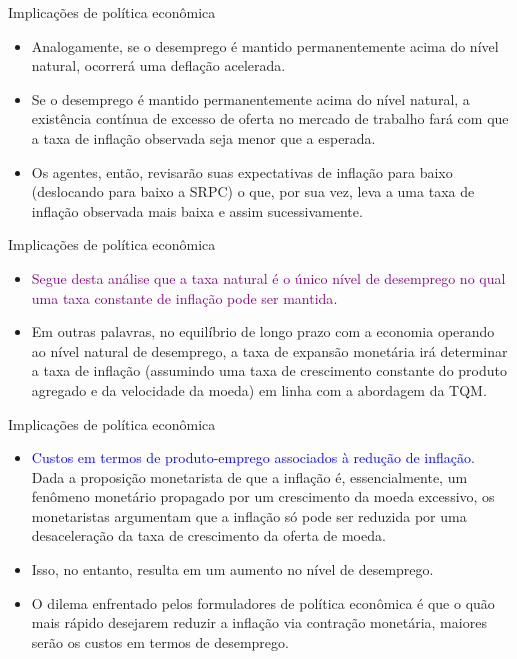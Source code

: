\documentclass[10pt]{beamer}
\begin{document}
\begin{frame}{Implicações de política econômica}
    \begin{itemize}
        \item Analogamente, se o desemprego é mantido permanentemente acima do nível natural, ocorrerá uma deflação acelerada.
        \bigskip
        \item Se o desemprego é mantido permanentemente acima do nível natural, a existência contínua de excesso de oferta no mercado de trabalho fará com que a taxa de inflação observada seja menor que a esperada.
        \bigskip
        \item Os agentes, então, revisarão suas expectativas de inflação para baixo (deslocando para baixo a SRPC) o que, por sua vez, leva a uma taxa de inflação observada mais baixa e assim sucessivamente.
    \end{itemize}    
\end{frame}

\begin{frame}{Implicações de política econômica}
    \begin{itemize}
        \item \textcolor{purple}{Segue desta análise que a taxa natural é o único nível de desemprego no qual uma taxa constante de inflação pode ser mantida}.
        \bigskip
        \item Em outras palavras, no equilíbrio de longo prazo com a economia operando ao nível natural de desemprego, a taxa de expansão monetária irá determinar a taxa de inflação (assumindo uma taxa de crescimento constante do produto agregado e da velocidade da moeda) em linha com a abordagem da TQM.
    \end{itemize}    
\end{frame}

\begin{frame}{Implicações de política econômica}
    \begin{itemize}
        \item \textcolor{blue}{Custos em termos de produto-emprego associados à redução de inflação}. Dada a proposição monetarista de que a inflação é, essencialmente, um fenômeno monetário propagado por um crescimento da moeda excessivo, os monetaristas argumentam que a inflação só pode ser reduzida por uma desaceleração da taxa de crescimento da oferta de moeda.
        \bigskip
        \item Isso, no entanto, resulta em um aumento no nível de desemprego.
        \bigskip
        \item O dilema enfrentado pelos formuladores de política econômica é que o quão mais rápido desejarem reduzir a inflação via contração monetária, maiores serão os custos em termos de desemprego.
    \end{itemize}    
\end{frame}
\end{document}
